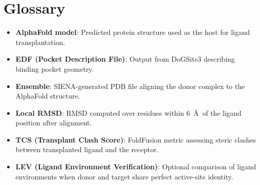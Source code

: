 \documentclass[11pt]{article}
\begin{document}
\section{Glossary}
\begin{itemize}[noitemsep]
      \item \textbf{AlphaFold model}: Predicted protein structure used as the host
            for ligand transplantation.
      \item \textbf{EDF (Pocket Description File)}: Output from DoGSite3 describing
            binding pocket geometry.
      \item \textbf{Ensemble}: SIENA-generated PDB file aligning the donor complex
            to the AlphaFold structure.
      \item \textbf{Local RMSD}: RMSD computed over residues within 6~\AA\ of the
            ligand position after alignment.
      \item \textbf{TCS (Transplant Clash Score)}: FoldFusion metric assessing steric
            clashes between transplanted ligand and the receptor.
      \item \textbf{LEV (Ligand Environment Verification)}: Optional comparison of
            ligand environments when donor and target share perfect active-site
            identity.
\end{itemize}
\end{document}
